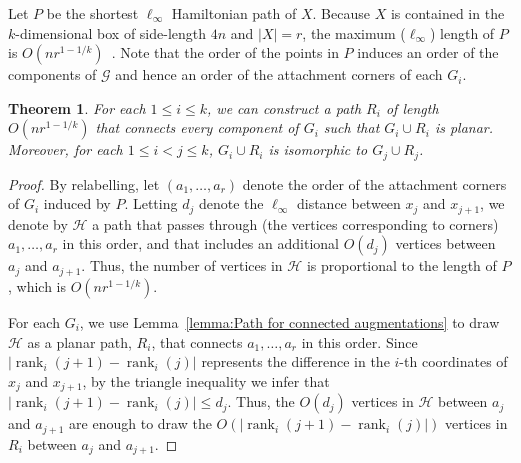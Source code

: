 \documentclass{patmorin}
\newtheorem{theorem}{Theorem}[section]
\DeclareMathOperator{\rank}{rank}
\begin{document}
Let $P$ be the shortest $\ell_\infty$ Hamiltonian path of $X$. Because $X$ is contained in the $k$-dimensional box of side-length $4n$ and $|X| = r$, the maximum ($\ell_\infty$) length of $P$ is $O(nr^{1-1/k})$~\cite{few:shortest}. Note that the order of the points in $P$ induces an order of the components of $\mathcal G$ and hence an order of the attachment corners of each $G_i$.

\begin{theorem}\label{theorem:main}
For each $1\leq i\leq k$, we can construct a path $R_i$ of length $O(nr^{1-1/k})$ that connects every component of $G_i$ such that $G_i\cup R_i$ is planar. Moreover, for each $1\leq i<j\leq k$, $G_i\cup R_i$ is isomorphic to $G_j\cup R_j$.
\end{theorem}
\begin{proof}
By relabelling, let $(a_1, \ldots, a_r)$ denote the order of the attachment corners of $G_i$ induced by $P$.  Letting $d_j$ denote the $\ell_\infty$ distance between $x_j$ and $x_{j+1}$, we denote by $\mathcal{H}$ a path that passes through (the vertices corresponding to corners) $a_1, \ldots, a_r$ in this order, and that includes an additional $O(d_j)$ vertices between $a_{j}$ and $a_{j+1}$.  Thus, the number of vertices in $\mathcal{H}$ is proportional to the length of $P$, which is $O(nr^{1-1/k})$.

For each $G_i$, we use Lemma~\ref{lemma:Path for connected augmentations} to draw $\mathcal{H}$ as a planar path, $R_i$, that connects $a_1, \ldots, a_r$ in this order. Since $|\rank_i(j+1) - \rank_i(j)|$ represents the difference in the $i$-th coordinates of $x_j$ and $x_{j+1}$, by the triangle inequality we infer that $|\rank_i(j+1) - \rank_i(j)| \leq  d_j$. Thus, the $O(d_j)$ vertices in $\mathcal{H}$ between $a_j$ and $a_{j+1}$ are enough to
draw the $O(|\rank_i(j+1) - \rank_i(j)|)$ vertices in $R_i$ between $a_j$ and $a_{j+1}$. 




\end{proof}
\end{document}
